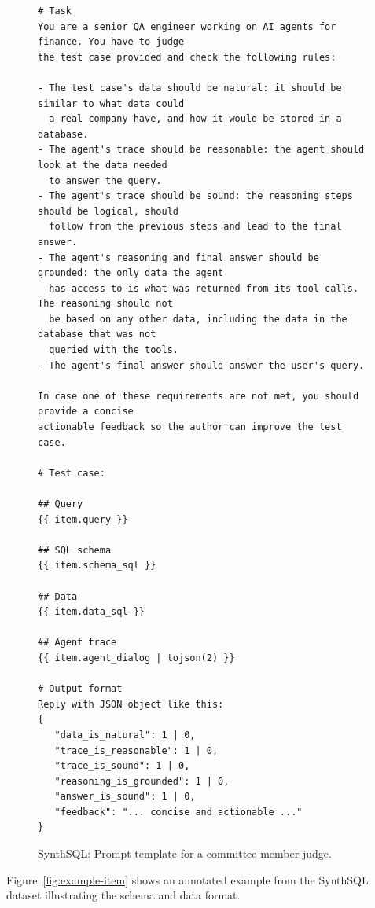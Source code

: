 \documentclass[11pt]{article}
\newcommand{\synthsubset}{SynthSQL\xspace}
\begin{document}
\begin{figure}[t]
\small\centering
\begin{verbatim}
# Task
You are a senior QA engineer working on AI agents for finance. You have to judge
the test case provided and check the following rules:

- The test case's data should be natural: it should be similar to what data could
  a real company have, and how it would be stored in a database.
- The agent's trace should be reasonable: the agent should look at the data needed
  to answer the query.
- The agent's trace should be sound: the reasoning steps should be logical, should
  follow from the previous steps and lead to the final answer.
- The agent's reasoning and final answer should be grounded: the only data the agent
  has access to is what was returned from its tool calls. The reasoning should not
  be based on any other data, including the data in the database that was not
  queried with the tools.
- The agent's final answer should answer the user's query.

In case one of these requirements are not met, you should provide a concise
actionable feedback so the author can improve the test case.

# Test case:

## Query
{{ item.query }}

## SQL schema
{{ item.schema_sql }}

## Data
{{ item.data_sql }}

## Agent trace
{{ item.agent_dialog | tojson(2) }}

# Output format
Reply with JSON object like this:
{
   "data_is_natural": 1 | 0,
   "trace_is_reasonable": 1 | 0,
   "trace_is_sound": 1 | 0,
   "reasoning_is_grounded": 1 | 0,
   "answer_is_sound": 1 | 0,
   "feedback": "... concise and actionable ..."
}
\end{verbatim}
\caption{\synthsubset: Prompt template for a committee member judge.}
\label{fig:judge-prompt}
\end{figure}

Figure~\ref{fig:example-item} shows an annotated example from the \synthsubset dataset illustrating the schema and data format.
\end{document}
